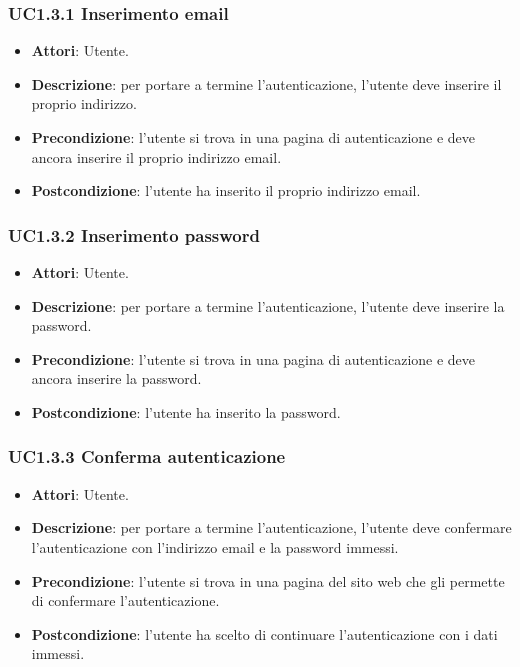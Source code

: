 \subsubsection{UC1.3.1 Inserimento email}
\begin{itemize}
\item \textbf{Attori}: Utente.
\item \textbf{Descrizione}: per portare a termine l'autenticazione, l'utente deve inserire il proprio indirizzo.
\item \textbf{Precondizione}: l'utente si trova in una pagina di autenticazione e deve ancora inserire il proprio indirizzo email.
\item \textbf{Postcondizione}: l'utente ha inserito il proprio indirizzo email.
\end{itemize}
\subsubsection{UC1.3.2 Inserimento password}
\begin{itemize}
\item \textbf{Attori}: Utente.
\item \textbf{Descrizione}: per portare a termine l'autenticazione, l'utente deve inserire la password.
\item \textbf{Precondizione}: l'utente si trova in una pagina di autenticazione e deve ancora inserire la password.
\item \textbf{Postcondizione}: l'utente ha inserito la password.
\end{itemize}
\subsubsection{UC1.3.3 Conferma autenticazione}
\begin{itemize}
\item \textbf{Attori}: Utente.
\item \textbf{Descrizione}: per portare a termine l'autenticazione, l'utente deve confermare l'autenticazione con l'indirizzo email e  la password immessi.
\item \textbf{Precondizione}: l'utente si trova in una pagina del sito web che gli permette di confermare l'autenticazione.
\item \textbf{Postcondizione}: l'utente ha scelto di continuare l'autenticazione con i dati immessi.
\end{itemize}
